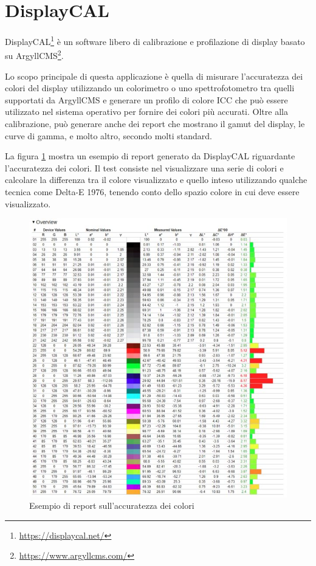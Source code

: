 \section{DisplayCAL}
DisplayCAL\footnote{\href{https://displaycal.net/}{https://displaycal.net/}} è un software libero di calibrazione e profilazione di display basato su ArgyllCMS\footnote{\href{https://www.argyllcms.com/}{https://www.argyllcms.com/}}.

Lo scopo principale di questa applicazione è quella di misurare l'accuratezza dei colori del display utilizzando un colorimetro o uno spettrofotometro tra quelli supportati da ArgyllCMS e generare un profilo di colore ICC che può essere utilizzato nel sistema operativo per fornire dei colori più accurati. Oltre alla calibrazione, può generare anche dei report che mostrano il gamut del display, le curve di gamma, e molto altro, secondo molti standard.

La figura \ref{fig:displaycal_report_example} mostra un esempio di report generato da DisplayCAL riguardante l'accuratezza dei colori. Il test consiste nel visualizzare una serie di colori e calcolare la differenza tra il colore visualizzato e quello inteso utilizzando qualche tecnica come Delta-E 1976, tenendo conto dello spazio colore in cui deve essere visualizzato.

\begin{figure}[h]
	\centering
	\includegraphics[width=\textwidth]{Chapter02/res/displaycal_report_example.jpg}
	\caption{Esempio di report sull'accuratezza dei colori}
	\label{fig:displaycal_report_example}
\end{figure}

